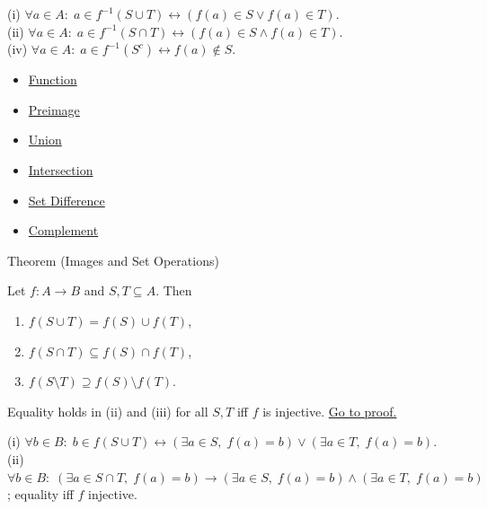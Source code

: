 \begin{remark*}
(i) $\forall a \in A:\; a \in f^{-1}(S\cup T) \leftrightarrow (f(a)\in S \vee f(a)\in T)$.\\
(ii) $\forall a \in A:\; a \in f^{-1}(S\cap T) \leftrightarrow (f(a)\in S \wedge f(a)\in T)$.\\
(iv) $\forall a \in A:\; a \in f^{-1}(S^c) \leftrightarrow f(a)\notin S$.
\end{remark*}

\begin{dependencies}
\begin{itemize}
  \item \hyperref[def:function]{Function}
  \item \hyperref[def:preimage]{Preimage}
  \item \hyperref[def:union]{Union}
  \item \hyperref[def:intersection]{Intersection}
  \item \hyperref[def:set-difference]{Set Difference}
  \item \hyperref[def:complement]{Complement}
\end{itemize}
\end{dependencies}

\begin{theorembox}{Theorem (Images and Set Operations)}
\begin{theorem}\label{thm:image-ops}
Let $f : A \to B$ and $S, T \subseteq A$. Then
\begin{enumerate}[label=(\roman*)]
\item $f(S \cup T) = f(S) \cup f(T)$,
\item $f(S \cap T) \subseteq f(S) \cap f(T)$,
\item $f(S \setminus T) \supseteq f(S) \setminus f(T)$.
\end{enumerate}
Equality holds in (ii) and (iii) for all $S,T$ iff $f$ is injective.
\hyperref[prf:image-ops]{Go to proof.}
\end{theorem}
\end{theorembox}

\begin{remark*}
(i) $\forall b\in B:\; b \in f(S\cup T) \leftrightarrow (\exists a\in S,\; f(a)=b) \vee (\exists a\in T,\; f(a)=b)$.\\
(ii) $\forall b\in B:\; (\exists a\in S\cap T,\; f(a)=b) \to (\exists a\in S,\; f(a)=b) \wedge (\exists a\in T,\; f(a)=b)$; equality iff $f$ injective.
\end{remark*}

